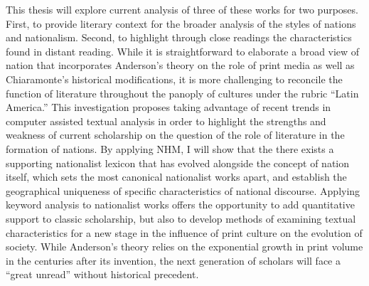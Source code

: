 \documentclass[12pt]{report}
\begin{document}
This thesis will explore current analysis of three of these works for two purposes. First, to provide literary context for the broader analysis of the styles of nations and nationalism. Second, to highlight through close readings the characteristics found in distant reading. While it is straightforward to elaborate a broad view of nation that incorporates Anderson's theory on the role of print media as well as Chiaramonte's historical modifications, it is more challenging to reconcile the function of literature throughout the panoply of cultures under the rubric \enquote{Latin America.} This investigation proposes taking advantage of recent trends in computer assisted textual analysis in order to highlight the strengths and weakness of current scholarship on the question of the role of literature in the formation of nations. 
By applying NHM, I will show that the there exists a supporting nationalist lexicon that has evolved alongside the concept of nation itself, which sets the most canonical nationalist works apart, and establish the geographical uniqueness of specific characteristics of national discourse. 
Applying keyword analysis to nationalist works offers the opportunity to add quantitative support to classic scholarship, but also to develop methods of examining textual characteristics for a new stage in the influence of print culture on the evolution of society. While Anderson's theory relies on the exponential growth in print volume in the centuries after its invention, the next generation of scholars will face a \enquote{great unread} without historical precedent.


\nocite{Sommer1997}
\nocite{Unzueta2003}
\nocite{Galdos1882}
\nocite{Cortazar1908}
\nocite{Mejia1976}
\nocite{Isaacs2012}
\nocite{Patino1992}
\nocite{Fox2011}
\nocite{Jagoe2003}
\nocite{Beckman2013}
\nocite{Beckman2012}
\nocite{Patriau2004}
\nocite{Ortiz2007}
\nocite{Skinner2014}
\nocite{Musselwhite2006}
\nocite{Palacios2002}
\nocite{Ordonez2005}
\nocite{Menton1978}
\nocite{Delgado2000}
\nocite{Montes1997}
\nocite{White1980}
\nocite{Gobat2013}
\nocite{Eder2013}
\nocite{RCT2014}
\nocite{McGrady2012}
\nocite{Cuervo1876}
\nocite{Davies2012}
\nocite{Moretti2013}
\nocite{Embree1998}

\nocite{Blanco2000}
\nocite{Underwood2014}
\nocite{Vanderwal2007}
\nocite{Kempen2007}
\nocite{Iarocci2003}
\nocite{Urey1992}
\nocite{Sieber1978}
\nocite{Galdos1882}
\nocite{Molinero2005}
\nocite{Rodgers2005}
\nocite{Storm2004}
\nocite{Villa2015}
\nocite{Rodriguez1967}
\nocite{Isasi2013}
\nocite{Coronado2009}




\makeworkscited
\end{document}

